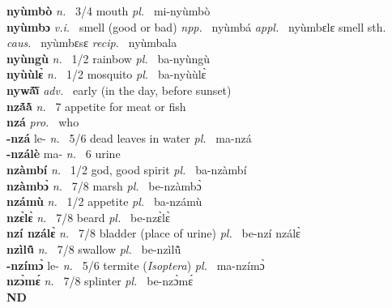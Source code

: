 {\bfseries nyùmbò}  {\itshape n.~} 3/4 mouth {\itshape pl.~} mi-nyùmbò    \\ 
{\bfseries nyùmbɔ}  {\itshape v.i.~} smell (good or bad)   {\itshape npp.~} nyùmbá {\itshape appl.~} nyùmbɛlɛ smell sth. {\itshape caus.~} nyùmbɛsɛ {\itshape recip.~} nyùmbala  \\ 
{\bfseries nyùngù}  {\itshape n.~} 1/2 rainbow {\itshape pl.~} ba-nyùngù    \\ 
{\bfseries nyùùlɛ̀}  {\itshape n.~} 1/2 mosquito {\itshape pl.~} ba-nyùùlɛ̀    \\ 
{\bfseries nywã́ĩ̀}  {\itshape adv.~} early (in the day, before sunset)    \\ 
{\bfseries nzã́ã̀}  {\itshape n.~} 7 appetite for meat or fish    \\ 
{\bfseries nzá}  {\itshape pro.~} who    \\ 
{\bfseries -nzá} le- {\itshape n.~} 5/6 dead leaves in water {\itshape pl.~} ma-nzá    \\ 
{\bfseries -nzálè} ma- {\itshape n.~} 6 urine    \\ 
{\bfseries nzàmbí}  {\itshape n.~} 1/2 god, good spirit {\itshape pl.~} ba-nzàmbí    \\ 
{\bfseries nzàmbɔ̀}  {\itshape n.~} 7/8 marsh {\itshape pl.~} be-nzàmbɔ̀    \\ 
{\bfseries nzámù}  {\itshape n.~} 1/2 appetite {\itshape pl.~} ba-nzámù    \\ 
{\bfseries nzɛ̀lɛ̀}  {\itshape n.~} 7/8 beard {\itshape pl.~} be-nzɛ̀lɛ̀    \\ 
{\bfseries nzí nzálɛ̀}  {\itshape n.~} 7/8 bladder (place of urine) {\itshape pl.~} be-nzí nzálɛ̀    \\ 
{\bfseries nzìlũ̂}  {\itshape n.~} 7/8 swallow {\itshape pl.~} be-nzìlũ̂    \\ 
{\bfseries -nzímɔ̀} le- {\itshape n.~} 5/6 termite ({\itshape Isoptera}) {\itshape pl.~} ma-nzímɔ̀    \\ 
{\bfseries nzɔ̀mɛ́}  {\itshape n.~} 7/8 splinter {\itshape pl.~} be-nzɔ̀mɛ́    \\ 

\medskip
\noindent \large {\bfseries ND}\normalsize\\
\medskip

